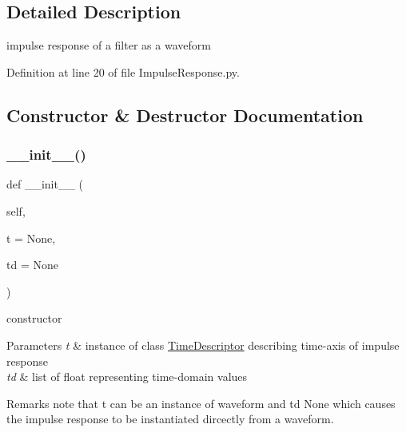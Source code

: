 \subsection{Detailed Description}
impulse response of a filter as a waveform 

Definition at line 20 of file Impulse\+Response.\+py.



\subsection{Constructor \& Destructor Documentation}
\mbox{\label{classSignalIntegrity_1_1TimeDomain_1_1Waveform_1_1ImpulseResponse_1_1ImpulseResponse_ade7e2b05916c8bb56f58333b3fca239d}} 
\subsubsection{\texorpdfstring{\+\_\+\+\_\+init\+\_\+\+\_\+()}{\_\_init\_\_()}}
{\footnotesize\ttfamily def \+\_\+\+\_\+init\+\_\+\+\_\+ (\begin{DoxyParamCaption}\item[{}]{self,  }\item[{}]{t = {\ttfamily None},  }\item[{}]{td = {\ttfamily None} }\end{DoxyParamCaption})}



constructor 


\begin{DoxyParams}{Parameters}
{\em t} & instance of class \hyperlink{namespaceSignalIntegrity_1_1TimeDomain_1_1Waveform_1_1TimeDescriptor}{Time\+Descriptor} describing time-\/axis of impulse response \\
\hline
{\em td} & list of float representing time-\/domain values \\
\hline
\end{DoxyParams}
\begin{DoxyRemark}{Remarks}
note that t can be an instance of waveform and td None which causes the impulse response to be instantiated dircectly from a waveform. 
\end{DoxyRemark}


